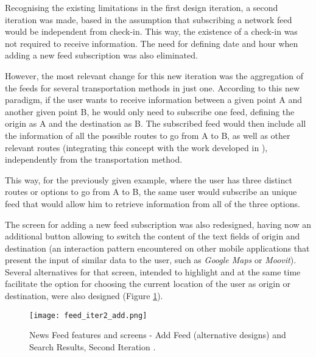 Recognising the existing limitations in the first design iteration,  a second iteration was made, based in the assumption that subscribing a network feed would be independent from check-in. This way, the existence of a check-in was not required to receive information. The need for defining date and hour when adding a new feed subscription was also eliminated.

However, the most relevant change for this new iteration was the aggregation of the feeds for several transportation methods in just one. According to this new paradigm, if the user wants to receive information between a given point A and another given point B, he would only need to subscribe one feed, defining the origin as A and the destination as B. The subscribed feed would then include all the information of all the possible routes to go from A to B, as well as other relevant routes (integrating this concept with the work developed in \cite{kn:Dia13}), independently from the transportation method. 

This way, for the previously given example, where the user has three distinct routes or options to go from A to B, the same user would subscribe an unique feed that would allow him to retrieve information from all of the three options.

The screen for adding a new feed subscription was also redesigned, having now an additional button allowing to switch the content of the text fields of origin and destination (an interaction pattern encountered on other mobile applications that present the input of similar data to the user, such as \emph{Google Maps} or \emph{Moovit}).
Several alternatives for that screen, intended to highlight and at the same time facilitate the option for choosing the current location of the user as origin or destination, were also designed (Figure \ref{fig:feed_iter2_add}).

\begin{figure}[!h]
  \begin{center}
    \leavevmode
    \texttt{[image: feed\_iter2\_add.png]}
    \caption{News Feed features and screens - Add Feed (alternative designs) and Search Results, Second Iteration .}
    \label{fig:feed_iter2_add}
  \end{center}
\end{figure}


